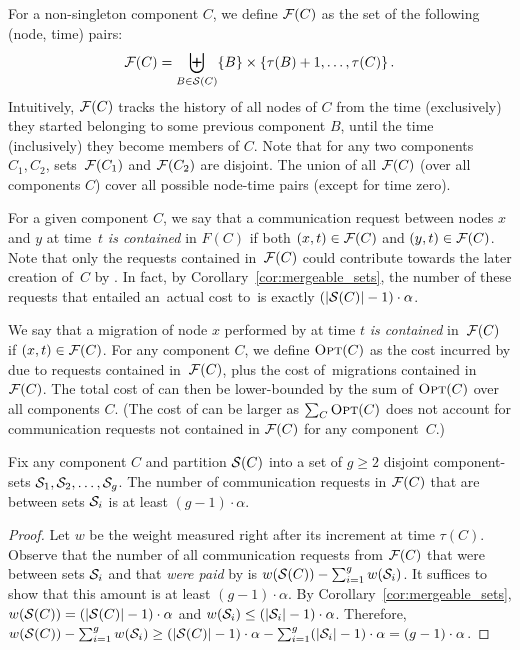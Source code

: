For a non-singleton component $C$, we 
define $\mathcal{F}(C)$ as the set of the following (node, time) pairs:
\begin{align*}
	\mathcal{F}(C) = \biguplus_{B \in \mathcal{S}(C)} \{ B \}  \times \left\{ \tau(B)+1, \ldots, \tau(C) \right\}.
\end{align*}
Intuitively, $\mathcal{F}(C)$ tracks the history of all nodes of $C$ from the time 
(exclusively) they started belonging to some previous component $B$, until the time 
(inclusively) they become members of $C$. Note that for any two components 
$C_1,C_2$, sets~$\mathcal{F}(C_1)$ and $\mathcal{F}(C_2)$ are disjoint.
The union of all $\mathcal{F}(C)$ (over all components $C$) 
cover all possible node-time pairs (except for time zero). 

For a given component $C$, we say that a communication request between nodes
$x$ and $y$ at time~$t$ \emph{is contained} in $F(C)$ if both $(x,t) \in \mathcal{F}(C)$
and $(y,t) \in \mathcal{F}(C)$. Note that only the requests contained in~$\mathcal{F}(C)$
could contribute towards the later creation of~$C$ by \CREP. In fact, by
Corollary~\ref{cor:mergeable_sets}, the number of these requests that
entailed an~actual cost to~\CREP is exactly $(|\mathcal{S}(C)| - 1) \cdot \alpha$.

We say that a migration of node $x$ performed by \OPT at time $t$ \emph{is
contained} in~$\mathcal{F}(C)$ if $(x,t) \in \mathcal{F}(C)$. For any component $C$, we define
$\textsc{Opt}(C)$ as the cost incurred by \OPT due to requests contained in~$\mathcal{F}(C)$, 
plus the cost of~\OPT migrations contained in~$\mathcal{F}(C)$. The total cost of \OPT
can then be lower-bounded by the sum of $\textsc{Opt}(C)$ over all components $C$.
(The cost of \OPT can be larger as $\sum_C \textsc{Opt}(C)$ does not account for 
communication requests not contained in $\mathcal{F}(C)$ for any component~$C$.)

\begin{lemma}
\label{lem:merge_action_cut}
Fix any component $C$ and partition $\mathcal{S}(C)$ into a set of $g \geq 2$ disjoint
component-sets $\mathcal{S}_1, \mathcal{S}_2, \ldots, \mathcal{S}_g$. The number of communication requests
in $\mathcal{F}(C)$ that are between sets $\mathcal{S}_i$ is at least $(g-1) \cdot \alpha$.
\end{lemma}

\begin{proof}
Let $w$ be the weight measured right after its increment at time $\tau(C)$.
Observe that the number of all communication requests from $\mathcal{F}(C)$ that were
between sets $\mathcal{S}_i$ and that \emph{were paid} by \CREP is $w(\mathcal{S}(C)) -
\sum_{i=1}^g w(\mathcal{S}_i)$. It suffices to show that this amount is at least $(g-1)
\cdot \alpha$. By Corollary~\ref{cor:mergeable_sets}, $w(\mathcal{S}(C)) = (|\mathcal{S}(C)|-1)
\cdot \alpha$ and $w(\mathcal{S}_i) \leq (|\mathcal{S}_i|-1) \cdot \alpha$. Therefore, $w(\mathcal{S}(C)) -
\sum_{i=1}^g w(\mathcal{S}_i) \geq (|\mathcal{S}(C)|-1) \cdot \alpha - \sum_{i=1}^g (|\mathcal{S}_i|-1)
\cdot \alpha = (g-1) \cdot \alpha$.
\end{proof}

